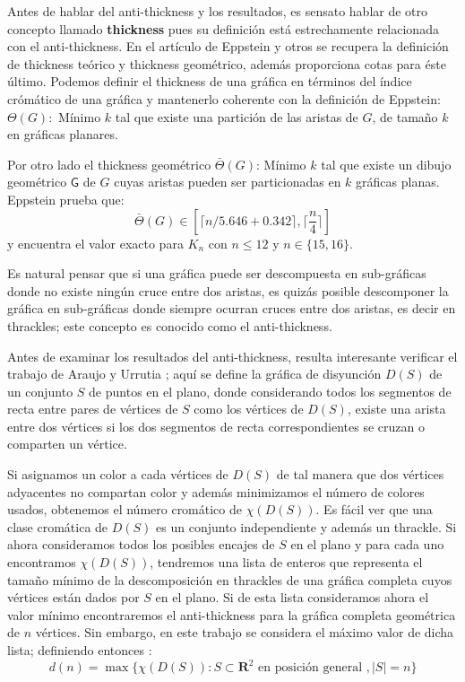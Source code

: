 Antes de hablar del anti-thickness y los resultados, es sensato hablar de otro
concepto llamado \textbf{thickness} pues su definición está estrechamente
relacionada con el anti-thickness. En el artículo de Eppstein y otros
\cite{Dillencourt2004} se recupera la definición de thickness teórico y thickness
geométrico, además proporciona cotas para éste último. Podemos definir el
thickness de una gráfica en términos del índice crómático de una gráfica y
mantenerlo coherente con la definición de Eppstein: $\Theta(G):$ Mínimo $k$
tal que existe una partición de las aristas de $G$, de tamaño $k$ en gráficas planares.

Por otro lado el thickness geométrico $\bar{\Theta}(G)$: Mínimo $k$ tal que
existe un dibujo geométrico $\mathsf{G}$ de $G$ cuyas aristas pueden ser
particionadas en $k$ gráficas planas. Eppstein prueba que:
\[ \bar{\Theta}(G) \in [\lceil n/5.646 + 0.342 \rceil, \lceil\frac{n}{4}\rceil] \]
y encuentra el valor exacto para $K_n$ con $n\leq 12$ y $n\in\{15,16\}$.

Es natural pensar que si una gráfica puede ser descompuesta en sub-gráficas donde
no existe ningún cruce entre dos aristas, es quizás posible descomponer la
gráfica en sub-gráficas donde siempre ocurran cruces entre dos aristas, es decir
en thrackles; este concepto es conocido como el anti-thickness.

Antes de examinar los resultados del anti-thickness, resulta interesante verificar
el trabajo de Araujo y Urrutia \cite{Araujo2005}; aquí se define la gráfica de
disyunción $D(S)$ de un conjunto $S$ de puntos en el plano, donde considerando
todos los segmentos de recta entre pares de vértices de $S$ como los vértices
de $D(S)$, existe una arista entre dos vértices si los dos segmentos
de recta correspondientes se cruzan o comparten un vértice.

Si asignamos un color a cada vértices de $D(S)$ de tal manera que dos
vértices adyacentes no compartan color y además minimizamos el número de colores
usados, obtenemos el número cromático de $\chi(D(S))$. Es fácil ver que una
clase cromática de $D(S)$ es un conjunto independiente y además un thrackle. Si
ahora consideramos todos los posibles encajes de $S$ en el plano y para cada uno
encontramos $\chi(D(S))$, tendremos una lista de enteros que representa el tamaño
mínimo de la descomposición en thrackles de una gráfica completa cuyos
vértices están dados por $S$ en el plano. Si de esta lista consideramos ahora
el valor mínimo encontraremos el anti-thickness para la gráfica completa geométrica de
$n$ vértices. Sin embargo, en este trabajo se considera el máximo valor de dicha lista;
definiendo entonces :
\[ d(n) = \max\{\chi(D(S)): S \subset \mathbf{R}^2 \text{ en posición general }, |S|=n\}\]

